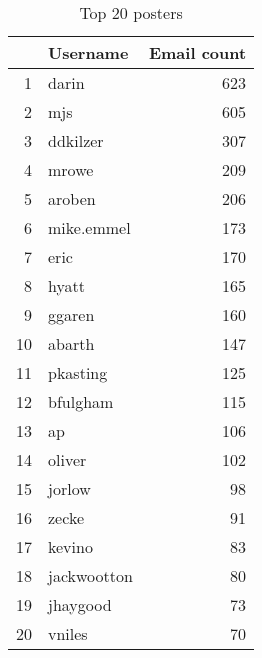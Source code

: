 \begin{table}[!htpb]
\begin{center}
\begin{tabular}{rlr}
  \hline
 & Username & Email count \\ 
  \hline
1 & darin & 623 \\ 
  2 & mjs & 605 \\ 
  3 & ddkilzer & 307 \\ 
  4 & mrowe & 209 \\ 
  5 & aroben & 206 \\ 
  6 & mike.emmel & 173 \\ 
  7 & eric & 170 \\ 
  8 & hyatt & 165 \\ 
  9 & ggaren & 160 \\ 
  10 & abarth & 147 \\ 
  11 & pkasting & 125 \\ 
  12 & bfulgham & 115 \\ 
  13 & ap & 106 \\ 
  14 & oliver & 102 \\ 
  15 & jorlow &  98 \\ 
  16 & zecke &  91 \\ 
  17 & kevino &  83 \\ 
  18 & jackwootton &  80 \\ 
  19 & jhaygood &  73 \\ 
  20 & vniles &  70 \\ 
   \hline
\end{tabular}
\caption{Top 20 posters}
\label{emails:top20}
\end{center}
\end{table}
